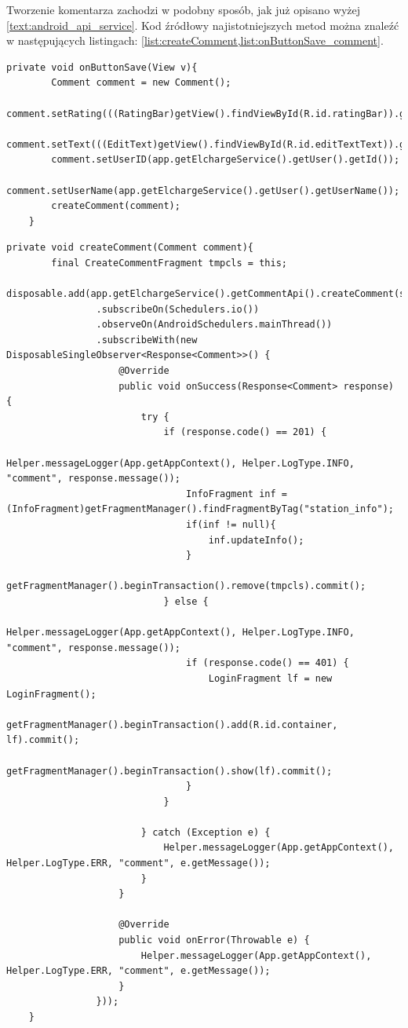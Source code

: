 Tworzenie komentarza zachodzi w podobny sposób, jak już opisano wyżej \ref{text:android_api_service}. Kod źródłowy najistotniejszych metod można znaleźć w następujących listingach: \ref{list:createComment,list:onButtonSave_comment}.
\begin{lstlisting}[label=list:onButtonSave_comment,caption=Edycja stacji ładowniczej,basicstyle=\tiny\ttfamily]
    private void onButtonSave(View v){
        Comment comment = new Comment();
        comment.setRating(((RatingBar)getView().findViewById(R.id.ratingBar)).getRating());
        comment.setText(((EditText)getView().findViewById(R.id.editTextText)).getText().toString());
        comment.setUserID(app.getElchargeService().getUser().getId());
        comment.setUserName(app.getElchargeService().getUser().getUserName());
        createComment(comment);
    }
\end{lstlisting}
\begin{lstlisting}[label=list:createComment,caption=Edycja stacji ładowniczej,basicstyle=\tiny\ttfamily]
    private void createComment(Comment comment){
        final CreateCommentFragment tmpcls = this;
        disposable.add(app.getElchargeService().getCommentApi().createComment(stationID,comment)
                .subscribeOn(Schedulers.io())
                .observeOn(AndroidSchedulers.mainThread())
                .subscribeWith(new DisposableSingleObserver<Response<Comment>>() {
                    @Override
                    public void onSuccess(Response<Comment> response) {
                        try {
                            if (response.code() == 201) {
                                Helper.messageLogger(App.getAppContext(), Helper.LogType.INFO, "comment", response.message());
                                InfoFragment inf = (InfoFragment)getFragmentManager().findFragmentByTag("station_info");
                                if(inf != null){
                                    inf.updateInfo();
                                }
                                getFragmentManager().beginTransaction().remove(tmpcls).commit();
                            } else {
                                Helper.messageLogger(App.getAppContext(), Helper.LogType.INFO, "comment", response.message());
                                if (response.code() == 401) {
                                    LoginFragment lf = new LoginFragment();
                                    getFragmentManager().beginTransaction().add(R.id.container, lf).commit();
                                    getFragmentManager().beginTransaction().show(lf).commit();
                                }
                            }

                        } catch (Exception e) {
                            Helper.messageLogger(App.getAppContext(), Helper.LogType.ERR, "comment", e.getMessage());
                        }
                    }

                    @Override
                    public void onError(Throwable e) {
                        Helper.messageLogger(App.getAppContext(), Helper.LogType.ERR, "comment", e.getMessage());
                    }
                }));
    }
\end{lstlisting}